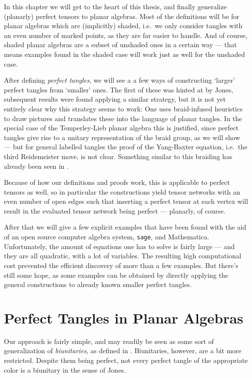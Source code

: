 In this chapter we will get to the heart of this thesis, and finally generalize (planarly) perfect tensors to planar algebras. Most of the definitions will be for planar algebras which are (implicitly) shaded, i.e.\ we only consider tangles with an even number of marked points, as they are far easier to handle. And of course, shaded planar algebras are a subset of unshaded ones in a certain way --- that means examples found in the shaded case will work just as well for the unshaded case.

After defining \emph{perfect tangles}, we will see a a few ways of constructing `larger' perfect tangles from `smaller' ones. The first of these was hinted at by Jones, subsequent results were found applying a similar strategy, but it is not yet entirely clear why this strategy seems to work: One uses braid-infused heuristics to draw pictures and translates these into the language of planar tangles. In the special case of the Temperley-Lieb planar algebra this is justified, since perfect tangles give rise to a unitary representation of the braid group, as we will show --- but for general labelled tangles the proof of the Yang-Baxter equation, i.e.\ the third Reidemeister move, is not clear. Something similar to this braiding has already been seen in \cite[Theorem 2.11.3]{jones1999planar1}.

Because of how our definitions and proofs work, this is applicable to perfect tensors as well, so in particular the constructions yield tensor networks with an even number of open edges such that inserting a perfect tensor at each vertex will result in the evaluated tensor network being perfect --- planarly, of course.

\bigno After that we will give a few explicit examples that have been found with the aid of an open source computer algebra system, \texttt{sage}, and Mathematica. Unfortunately, the amount of equations one has to solve is fairly large --- and they are all quadratic, with a lot of variables. The resulting high computational cost prevented the efficient discovery of more than a few examples. But there's still some hope, as some examples can be obtained by directly applying the general constructions to already known smaller perfect tangles.

\section{Perfect Tangles in Planar Algebras}
Our approach is fairly simple, and may readily be seen as some sort of generalization of \emph{biunitaries}, as defined in \cite[p.\ 54 ff.]{jones1999planar1}. Biunitaries, however, are a bit more restricted. Despite them being perfect, not every perfect tangle of the appropriate color is a biunitary in the sense of Jones.

